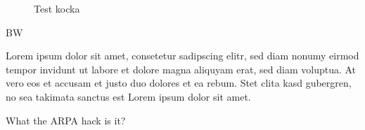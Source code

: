 
\begin{figure}
    \begin{center}
    
    \caption{Test kocka}
    \label{pic:kocka} 
    \end{center}
\end{figure}


\ac{BW}

Lorem ipsum dolor sit amet, consetetur sadipscing elitr, sed diam nonumy eirmod
tempor invidunt ut labore et dolore magna aliquyam erat, sed diam voluptua. At
vero eos et accusam et justo duo dolores et ea rebum. Stet clita kasd gubergren,
no sea takimata sanctus est Lorem ipsum dolor sit amet.

What the \ac{ARPA} hack is it?
